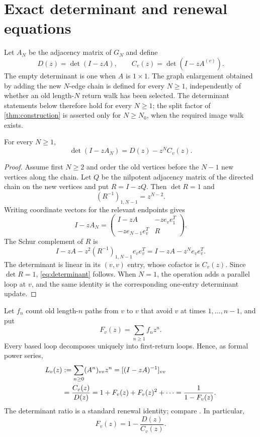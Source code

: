 \section{Exact determinant and renewal equations}
\label{sec:exact}

Let $A_N$ be the adjacency matrix of $G_N$ and define
\[
 D(z)=\det(I-zA),\qquad
 C_v(z)=\det(I-zA^{(v)}).
\]
The empty determinant is one when $A$ is $1\times1$.
The graph enlargement obtained by adding the new $N$-edge chain is defined
for every $N\ge1$, independently of whether an old length-$N$ return walk
has been selected.  The determinant statements below therefore hold for
every $N\ge1$; the split factor of \cref{thm:construction} is asserted only
for $N\ge N_0$, when the required image walk exists.

\begin{proposition}
\label{prop:determinant}
For every $N\ge1$,
\begin{equation}
 \det(I-zA_N)=D(z)-z^NC_v(z).
 \label{eq:determinant}
\end{equation}
\end{proposition}

\begin{proof}
Assume first $N\ge2$ and order the old vertices before the $N-1$ new
vertices along the chain.  Let $Q$ be the nilpotent adjacency matrix of the
directed chain on the new vertices and put $R=I-zQ$.  Then $\det R=1$ and
\[
 (R^{-1})_{1,N-1}=z^{N-2}.
\]
Writing coordinate vectors for the relevant endpoints gives
\[
 I-zA_N=
 \begin{pmatrix}
 I-zA & -z e_ve_1^T\\
 -z e_{N-1}e_v^T & R
 \end{pmatrix}.
\]
The Schur complement of $R$ is
\[
 I-zA-z^2(R^{-1})_{1,N-1}e_ve_v^T
 =I-zA-z^Ne_ve_v^T.
\]
The determinant is linear in its $(v,v)$ entry, whose cofactor is $C_v(z)$.
Since $\det R=1$, \cref{eq:determinant} follows.  When $N=1$, the operation
adds a parallel loop at $v$, and the same identity is the corresponding
one-entry determinant update.
\end{proof}

Let $f_n$ count old length-$n$ paths from $v$ to $v$ that avoid $v$ at
times $1,\ldots,n-1$, and put
\[
 F_v(z)=\sum_{n\ge1}f_nz^n.
\]
Every based loop decomposes uniquely into first-return loops.  Hence, as
formal power series,
\begin{align}
 L_v(z)
 &:=\sum_{n\ge0}(A^n)_{vv}z^n
 =[(I-zA)^{-1}]_{vv} \notag\\
 &=\frac{C_v(z)}{D(z)}
 =1+F_v(z)+F_v(z)^2+\cdots
 =\frac1{1-F_v(z)}.
 \label{eq:renewal}
\end{align}
The determinant ratio is a standard renewal identity; compare
\cite{Gomez2010,BlockEtAl1980}.  In particular,
\begin{equation}
 F_v(z)=1-\frac{D(z)}{C_v(z)}.
 \label{eq:F-determinant}
\end{equation}

